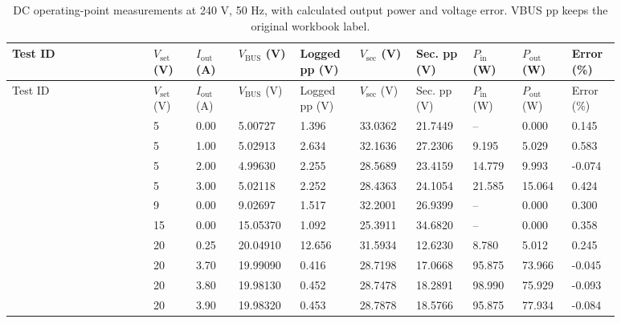 \begin{landscape}
\begingroup
\scriptsize
\setlength{\tabcolsep}{3pt}
\renewcommand{\arraystretch}{1.12}
\begin{longtable}{@{}L{0.2038\linewidth} L{0.0648\linewidth} L{0.0648\linewidth} L{0.0834\linewidth} L{0.0834\linewidth} L{0.0834\linewidth} L{0.0834\linewidth} L{0.0741\linewidth} L{0.0741\linewidth} L{0.0648\linewidth}@{}}
\caption{DC operating-point measurements at 240 V, 50 Hz, with calculated output power and voltage error. VBUS pp keeps the original workbook label.}\label{tab:appendix-dc-complete}\\
\toprule
Test ID & $V_\mathrm{set}$ (V) & $I_\mathrm{out}$ (A) & $V_\mathrm{BUS}$ (V) & Logged pp (V) & $V_\mathrm{sec}$ (V) & Sec. pp (V) & $P_\mathrm{in}$ (W) & $P_\mathrm{out}$ (W) & Error (\%)\\
\midrule
\endfirsthead
\toprule
Test ID & $V_\mathrm{set}$ (V) & $I_\mathrm{out}$ (A) & $V_\mathrm{BUS}$ (V) & Logged pp (V) & $V_\mathrm{sec}$ (V) & Sec. pp (V) & $P_\mathrm{in}$ (W) & $P_\mathrm{out}$ (W) & Error (\%)\\
\midrule
\endhead
{} & 5 & 0.00 & 5.00727 & 1.396 & 33.0362 & 21.7449 & -- & 0.000 & 0.145\\
 & 5 & 1.00 & 5.02913 & 2.634 & 32.1636 & 27.2306 & 9.195 & 5.029 & 0.583\\
 & 5 & 2.00 & 4.99630 & 2.255 & 28.5689 & 23.4159 & 14.779 & 9.993 & -0.074\\
 & 5 & 3.00 & 5.02118 & 2.252 & 28.4363 & 24.1054 & 21.585 & 15.064 & 0.424\\
 & 9 & 0.00 & 9.02697 & 1.517 & 32.2001 & 26.9399 & -- & 0.000 & 0.300\\
 & 15 & 0.00 & 15.05370 & 1.092 & 25.3911 & 34.6820 & -- & 0.000 & 0.358\\
 & 20 & 0.25 & 20.04910 & 12.656 & 31.5934 & 12.6230 & 8.780 & 5.012 & 0.245\\
 & 20 & 3.70 & 19.99090 & 0.416 & 28.7198 & 17.0668 & 95.875 & 73.966 & -0.045\\
 & 20 & 3.80 & 19.98130 & 0.452 & 28.7478 & 18.2891 & 98.990 & 75.929 & -0.093\\
 & 20 & 3.90 & 19.98320 & 0.453 & 28.7878 & 18.5766 & 95.875 & 77.934 & -0.084\\

\end{longtable}
\end{landscape}
